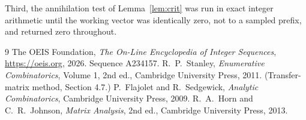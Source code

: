 \documentclass[11pt,a4paper]{article}
\theoremstyle{plain}
\theoremstyle{definition}
\begin{document}
Third, the annihilation test of Lemma~\ref{lem:crit} was run in exact integer arithmetic
until the working vector was identically zero, not to a sampled prefix, and returned zero
throughout.

\begin{thebibliography}{9}
 The OEIS Foundation, \emph{The On-Line Encyclopedia of Integer
Sequences}, \url{https://oeis.org}, 2026. Sequence A234157.
 R.~P.~Stanley, \emph{Enumerative Combinatorics}, Volume 1, 2nd ed.,
Cambridge University Press, 2011. (Transfer-matrix method, Section 4.7.)
 P.~Flajolet and R.~Sedgewick, \emph{Analytic Combinatorics}, Cambridge
University Press, 2009.
 R.~A.~Horn and C.~R.~Johnson, \emph{Matrix Analysis}, 2nd ed., Cambridge
University Press, 2013.
\end{thebibliography}
\end{document}
